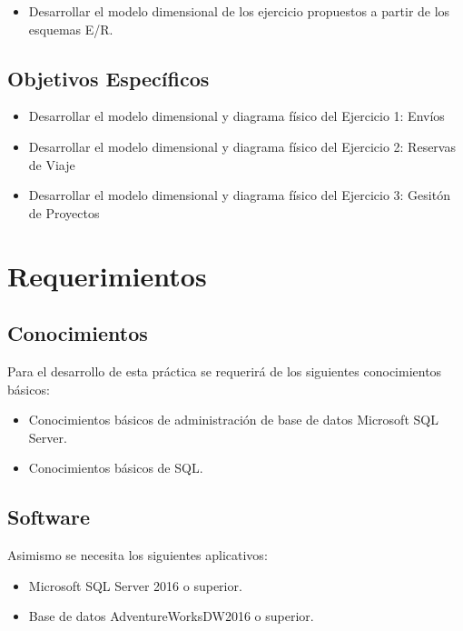 \documentclass{article}
\begin{document}
\begin{itemize}
\item Desarrollar el modelo dimensional de los ejercicio propuestos a partir de los esquemas E/R.

\end{itemize}


\subsection{\textbf{Objetivos Específicos}}
\begin{itemize}
\item Desarrollar el modelo dimensional y diagrama físico del Ejercicio 1: Envíos
\item Desarrollar el modelo dimensional y diagrama físico del Ejercicio 2: Reservas de Viaje
\item Desarrollar el modelo dimensional y diagrama físico del Ejercicio 3: Gesitón de Proyectos
\end{itemize}

\section {\textbf{Requerimientos}}

\subsection{\textbf{Conocimientos}}
Para el desarrollo de esta práctica se requerirá de los siguientes conocimientos básicos:
\begin{itemize}
\item Conocimientos básicos de administración de base de datos Microsoft SQL Server.
\item Conocimientos básicos de SQL.
\end{itemize}



\subsection{\textbf{Software}}
Asimismo se necesita los siguientes aplicativos:
\begin{itemize}
\item Microsoft SQL Server 2016 o superior.
\item Base de datos AdventureWorksDW2016 o superior.
\end{itemize}
\end{document}
